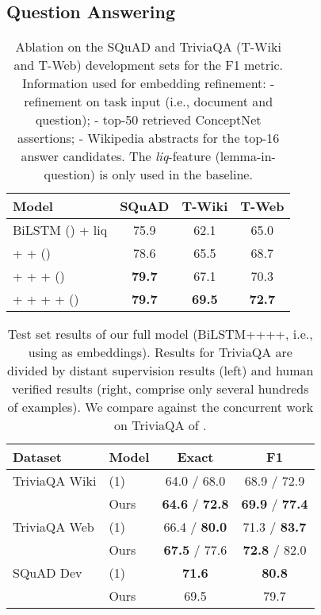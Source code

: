 \documentclass[11pt,a4paper]{article}
\begin{document}
\subsection{Question Answering}

\begin{table}[t]
    \small
    \centering
        \begin{tabular}{l c c c}
            \toprule
            \textbf{Model} & \textbf{SQuAD} & \textbf{T-Wiki} & \textbf{T-Web} \\
            \midrule 
            BiLSTM () + liq & 75.9 & 62.1 & 65.0 \\
            +  +  () & 78.6 & 65.5 & 68.7 \\ 
            +  +  +  () & \textbf{79.7} & 67.1 & 70.3 \\
            +  +  +  +  () & \textbf{79.7} & \textbf{69.5} & \textbf{72.7} \\
            \bottomrule
        \end{tabular}
        \caption{Ablation on the SQuAD and TriviaQA (T-Wiki and T-Web) development sets for the F1 metric. Information used for embedding refinement: - refinement on task input (i.e., document and question); - top-50 retrieved ConceptNet assertions; - Wikipedia abstracts for the top-16 answer candidates. The \textit{liq}-feature (lemma-in-question) is only used in the baseline.}\label{tab:qa_results}
\end{table}

\begin{table}[t]
    \small
    \centering
        \begin{tabular}{l l c c}
        \toprule
            \textbf{Dataset} & \textbf{Model} & \textbf{Exact} & \textbf{F1} \\
            \midrule
            TriviaQA Wiki & (1) & 64.0 / 68.0 & 68.9 / 72.9 \\ 
             & Ours & \textbf{64.6} / \textbf{72.8} & \textbf{69.9} / \textbf{77.4} \\
            \midrule
            TriviaQA Web & (1) & 66.4 / \textbf{80.0} & 71.3 / \textbf{83.7} \\ 
             & Ours & \textbf{67.5} / 77.6 &	\textbf{72.8} / 82.0  \\
            \midrule
            SQuAD Dev & (1) & \textbf{71.6} & \textbf{80.8} \\ 
                & Ours & 69.5 & 79.7 \\ 
            \bottomrule
        \end{tabular}
        \caption{Test set results of our full model (BiLSTM++++, i.e., using  as embeddings). Results for TriviaQA are divided by distant supervision results (left) and human verified results (right, comprise only several hundreds of examples). We compare against the concurrent work on TriviaQA of .}\label{tab:qa_test_results}
\end{table}
\end{document}
